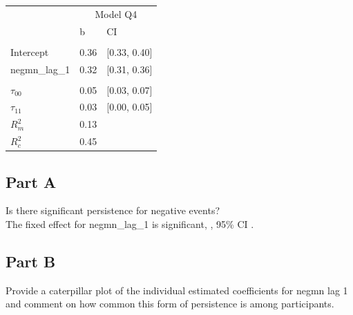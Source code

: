 \documentclass[]{article}
\begin{document}
\begin{table}[H]
\centering
\begin{tabular}{lll}
\toprule
\multicolumn{1}{c}{ } & \multicolumn{2}{c}{Model Q4} \\
\cmidrule(l{2pt}r{2pt}){2-3}
 & b & CI\\
\midrule
\addlinespace[0.3em]
\multicolumn{3}{l}{\textbf{Fixed}}\\
\hspace{1em}Intercept & 0.36 & [0.33, 0.40]\\
\hspace{1em}negmn\_lag\_1 & 0.32 & [0.31, 0.36]\\
\addlinespace[0.3em]
\multicolumn{3}{l}{\textbf{Random}}\\
\hspace{1em}$\tau_{00}$ & 0.05 & [0.03, 0.07]\\
\hspace{1em}$\tau_{11}$ & 0.03 & [0.00, 0.05]\\
$R^2_m$ & 0.13 & \\
$R^2_c$ & 0.45 & \\
\bottomrule
\end{tabular}
\end{table}

\subsection{Part A}\label{part-a-2}

Is there significant persistence for negative events?\\
The fixed effect for negmn\_lag\_1 is significant, , 95\% CI .

\subsection{Part B}\label{part-b-2}

Provide a caterpillar plot of the individual estimated coefficients for
negmn lag 1 and comment on how common this form of persistence is among
participants.
\end{document}
